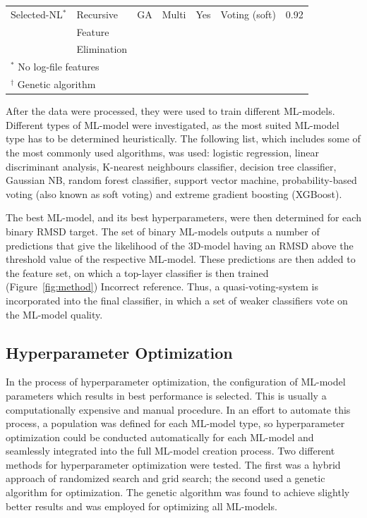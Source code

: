 \documentclass[12pt]{article}
\newcommand{\lilian}[1]{ {\color{red}{\bfseries Lilian:} #1}}
\begin{document}
\begin{table}
\begin{tabular}{lllllll}
    Selected-NL$^*$ & Recursive     & GA                & Multi    & Yes       & Voting (soft) & 0.92 \\
                    & Feature       &                   &          &           &               &      \\
                    & Elimination   &                   &          &           &               &      \\ \hline
    \multicolumn{7}{l}{$^*$ No log-file features} \\
    \multicolumn{7}{l}{$^\dag$ Genetic algorithm} \\
    \end{tabular}
\end{table}

After the data were processed, they were used to train different
ML-models. Different types of ML-model were investigated, as the most
suited ML-model type has to be determined heuristically. 
The following list, which includes some of the most commonly used
algorithms, was used: logistic regression, linear discriminant analysis,
K-nearest neighbours classifier, decision tree classifier, Gaussian
NB, random forest classifier, support vector machine,
probability-based voting (also known as soft voting) and extreme
gradient boosting (XGBoost)\cite{Chen2016}.

The best ML-model, and its best hyperparameters, were then determined for
each binary RMSD target. The set of binary ML-models outputs a number of
predictions that give the likelihood of the 3D-model having an RMSD above
the threshold value of the respective ML-model. These predictions are
then added to the feature set, on which a top-layer classifier is then
trained (Figure~\ref{fig:method})\lilian{Incorrect reference}. Thus, a quasi-voting-system is incorporated into the final
classifier, in which a set of weaker classifiers vote on the ML-model
quality.

\subsection{Hyperparameter Optimization}
In the process of hyperparameter optimization, the configuration of
ML-model parameters which results in best performance is selected. This
is usually a computationally expensive and manual procedure.
In an effort to automate this process, a population was defined for
each ML-model type, so hyperparameter optimization could be conducted
automatically for each ML-model and seamlessly integrated into the full
ML-model creation process. Two different methods for hyperparameter
optimization were tested. The first was a hybrid approach of randomized
search and grid search; the second used a genetic algorithm for
optimization. The genetic algorithm was found to achieve slightly
better results and was employed for optimizing all ML-models.
\end{document}
